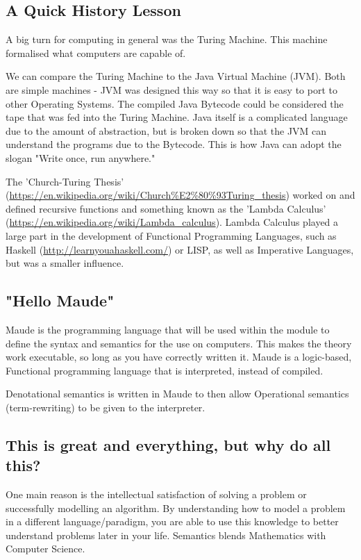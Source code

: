\documentclass[12pt]{article}
\begin{document}
\subsection{A Quick History Lesson}
\label{sec-1-5}
A big turn for computing in general was the Turing Machine.  This machine
formalised what computers are capable of.

We can compare the Turing Machine to the Java Virtual Machine (JVM).  Both are
simple machines - JVM was designed this way so that it is easy to port to other
Operating Systems.  The compiled Java Bytecode could be considered the tape
that was fed into the Turing Machine.  Java itself is a complicated language
due to the amount of abstraction, but is broken down so that the JVM can
understand the programs due to the Bytecode.  This is how Java can adopt the
slogan "Write once, run anywhere."

The 'Church-Turing Thesis'
(\url{https://en.wikipedia.org/wiki/Church\%E2\%80\%93Turing_thesis}) worked on and
defined recursive functions and something known as the 'Lambda Calculus'
(\url{https://en.wikipedia.org/wiki/Lambda_calculus}).  Lambda Calculus played a
large part in the development of Functional Programming Languages, such as
Haskell (\url{http://learnyouahaskell.com/}) or LISP, as well as Imperative
Languages, but was a smaller influence.

\subsection{"Hello Maude"}
\label{sec-1-6}
Maude is the programming language that will be used within the module to define
the syntax and semantics for the use on computers.  This makes the theory work
executable, so long as you have correctly written it.  Maude is a logic-based,
Functional programming language that is interpreted, instead of compiled.

Denotational semantics is written in Maude to then allow Operational semantics
(term-rewriting) to be given to the interpreter.

\subsection{This is great and everything, but why do all this?}
\label{sec-1-7}
One main reason is the intellectual satisfaction of solving a problem or
successfully modelling an algorithm.  By understanding how to model a problem
in a different language/paradigm, you are able to use this knowledge to better
understand problems later in your life.  Semantics blends Mathematics with
Computer Science.
\end{document}
